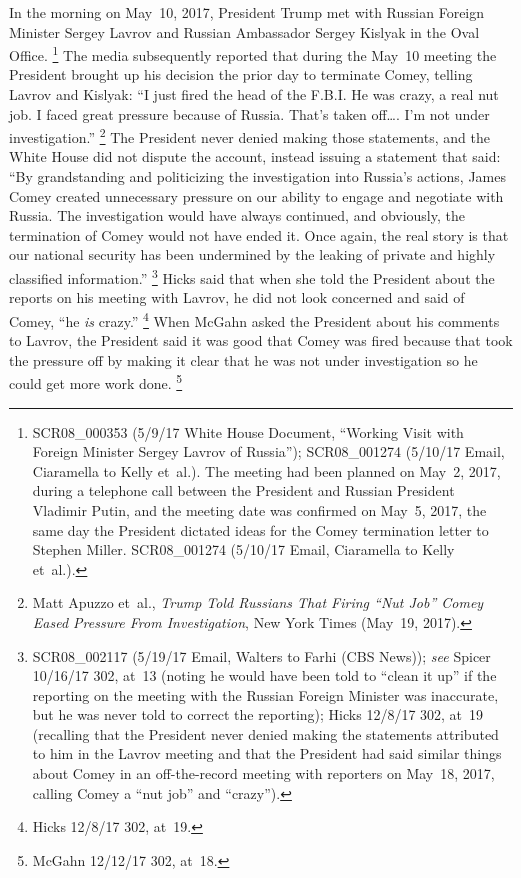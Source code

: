 In the morning on May~10, 2017, President Trump met with Russian Foreign Minister Sergey Lavrov and Russian Ambassador Sergey Kislyak in the Oval Office.%
\footnote{SCR08\_000353 (5/9/17 White House Document, ``Working Visit with Foreign Minister Sergey Lavrov of Russia'');
SCR08\_001274 (5/10/17 Email, Ciaramella to Kelly et~al.).
The meeting had been planned on May~2, 2017, during a telephone call between the President and Russian President Vladimir Putin, and the meeting date was confirmed on May~5, 2017, the same day the President dictated ideas for the Comey termination letter to Stephen Miller.
SCR08\_001274 (5/10/17 Email, Ciaramella to Kelly et~al.).}
The media subsequently reported that during the May~10 meeting the President brought up his decision the prior day to terminate Comey, telling Lavrov and Kislyak:
``I just fired the head of the F.B.I\null.
He was crazy, a real nut job.
I faced great pressure because of Russia.
That's taken off\dots.
I'm not under investigation.''%
\footnote{Matt Apuzzo et~al., \textit{Trump Told Russians That Firing ``Nut Job'' Comey Eased Pressure From Investigation}, New York Times (May~19, 2017).}
The President never denied making those statements, and the White House did not dispute the account, instead issuing a statement that said:
``By grandstanding and politicizing the investigation into Russia's actions, James Comey created unnecessary pressure on our ability to engage and negotiate with Russia.
The investigation would have always continued, and obviously, the termination of Comey would not have ended it.
Once again, the real story is that our national security has been undermined by the leaking of private and highly classified information.''%
\footnote{SCR08\_002117 (5/19/17 Email, Walters to Farhi (CBS News));
\textit{see} Spicer 10/16/17 302, at~13 (noting he would have been told to ``clean it up'' if the reporting on the meeting with the Russian Foreign Minister was inaccurate, but he was never told to correct the reporting);
Hicks 12/8/17 302, at~19 (recalling that the President never denied making the statements attributed to him in the Lavrov meeting and that the President had said similar things about Comey in an off-the-record meeting with reporters on May~18, 2017, calling Comey a ``nut job'' and ``crazy'').}
Hicks said that when she told the President about the reports on his meeting with Lavrov, he did not look concerned and said of Comey, ``he \textit{is} crazy.''%
\footnote{Hicks 12/8/17 302, at~19.}
When McGahn asked the President about his comments to Lavrov, the President said it was good that Comey was fired because that took the pressure off by making it clear that he was not under investigation so he could get more work done.%
\footnote{McGahn 12/12/17 302, at~18.}

